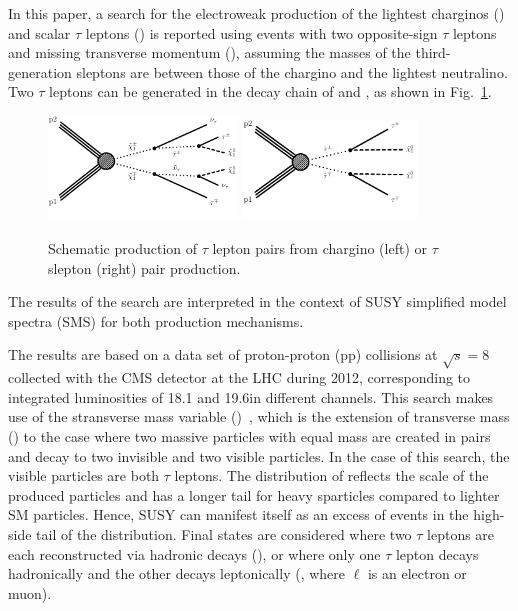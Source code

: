 In this paper, a search for the electroweak production of the lightest charginos (\PSGcpmDo) and scalar $\tau$  leptons (\PSGt) is reported using events
with two opposite-sign $\tau$ leptons and
missing transverse momentum (\MPT), assuming the masses of the third-generation sleptons are between those of the
chargino and the lightest neutralino.
Two $\tau$ leptons can be generated in the decay chain of \PSGcpmDo and \PSGt, as shown in Fig.~\ref{fig:Productions}.
\begin{figure}[!htb]
\centering
\includegraphics[width=0.45\textwidth]{Figure_001-a.pdf}
\includegraphics[width=0.41\textwidth]{Figure_001-b.pdf}
\caption{Schematic production of $\tau$ lepton pairs from chargino (left) or $\tau$ slepton (right) pair production.}
\label{fig:Productions}
\end{figure}
The results of the search are interpreted in the context of SUSY simplified model spectra (SMS) \cite{Alwall:2008ag,alves:sms} for both
production mechanisms.


The results are based on a data set of proton-proton (pp)
collisions at $\sqrt{s} = 8$\TeV
collected with the CMS detector at the LHC during 2012, corresponding to integrated
luminosities of 18.1 and 19.6\fbinv in different channels.
This search makes use of the stransverse mass variable (\mttwo)~\cite{Lester:1999tx,Barr:2003rg},
which is the extension of transverse mass (\mt) to the case
where two massive particles with equal mass are created in pairs
and decay to two invisible and two visible particles.
In the case of this search, the visible particles are both $\tau$ leptons.
The distribution of \mttwo reflects the scale of the produced particles and has a longer tail for heavy sparticles
compared to lighter SM particles. Hence, SUSY
can manifest itself
as an excess of events in the high-side tail of the \mttwo distribution.
Final states are considered where
two $\tau$ leptons are each reconstructed via hadronic decays (\tauTau),
or where only one $\tau$ lepton  decays hadronically and
the other decays leptonically (\leptonTau, where $\ell$ is an electron or muon).

